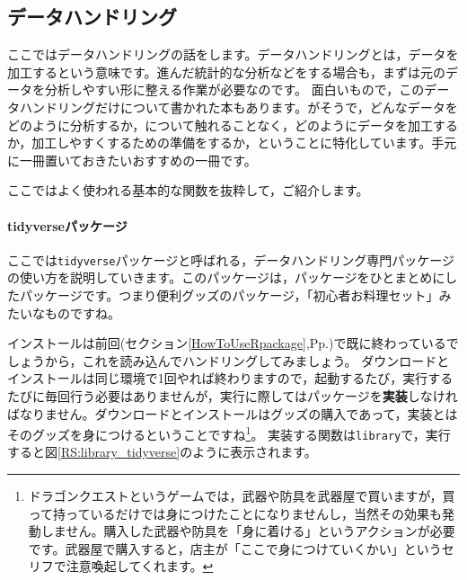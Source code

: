 \documentclass{ltjsbook}
\begin{document}


\subsection{データハンドリング}
\label{dataHandling}
ここではデータハンドリングの話をします。データハンドリングとは，データを加工するという意味です。進んだ統計的な分析などをする場合も，まずは元のデータを分析しやすい形に整える作業が必要なのです。
面白いもので，このデータハンドリングだけについて書かれた本もあります。\textcite{Kinosady2021}がそうで，どんなデータをどのように分析するか，について触れることなく，どのようにデータを加工するか，加工しやすくするための準備をするか，ということに特化しています。手元に一冊置いておきたいおすすめの一冊です。

ここではよく使われる基本的な関数を抜粋して，ご紹介します。

\paragraph{tidyverseパッケージ}
ここでは\verb|tidyverse|パッケージと呼ばれる，データハンドリング専門パッケージの使い方を説明していきます。このパッケージは，パッケージをひとまとめにしたパッケージです。つまり便利グッズのパッケージ，「初心者お料理セット」みたいなものですね。


インストールは前回(セクション\ref{HowToUseRpackage},Pp.\pageref{HowToUseRpackage})で既に終わっているでしょうから，これを読み込んでハンドリングしてみましょう。
ダウンロードとインストールは同じ環境で1回やれば終わりますので，起動するたび，実行するたびに毎回行う必要はありませんが，実行に際してはパッケージを\textbf{実装}しなければなりません。ダウンロードとインストールはグッズの購入であって，実装とはそのグッズを身につけるということですね\footnote{ドラゴンクエストというゲームでは，武器や防具を武器屋で買いますが，買って持っているだけでは身につけたことになりませんし，当然その効果も発動しません。購入した武器や防具を「身に着ける」というアクションが必要です。武器屋で購入すると，店主が「ここで身につけていくかい」というセリフで注意喚起してくれます。}。
実装する関数は\verb|library|で，実行すると図\ref{RS:library_tidyverse}のように表示されます。
\end{document}
